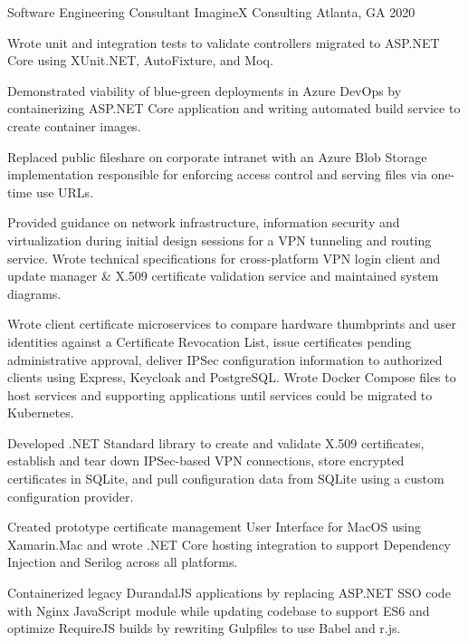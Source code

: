 

\begin{cventries}

  \cventry
    {Software Engineering Consultant} %
    {ImagineX Consulting} %
    {Atlanta, GA} %
    {2020} %
    {
      \begin{cvitems} %
        \item {Wrote unit and integration tests to validate controllers migrated to ASP.NET Core using XUnit.NET, AutoFixture, and Moq.}
        \item {Demonstrated viability of blue-green deployments in Azure DevOps by containerizing ASP.NET Core application and writing automated build service to create container images.}
        \item {Replaced public fileshare on corporate intranet with an Azure Blob Storage implementation responsible for enforcing access control and serving files via one-time use URLs.}
        \item {Provided guidance on network infrastructure, information security and virtualization during initial design sessions for a VPN tunneling and routing service. Wrote technical specifications for cross-platform VPN login client and update manager \& X.509 certificate validation service and maintained system diagrams.}
        \item {Wrote client certificate microservices to compare hardware thumbprints and user identities against a Certificate Revocation List, issue certificates pending administrative approval, deliver IPSec configuration information to authorized clients using Express, Keycloak and PostgreSQL. Wrote Docker Compose files to host services and supporting applications until services could be migrated to Kubernetes.}
        \item {Developed .NET Standard library to create and validate X.509 certificates, establish and tear down IPSec-based VPN connections, store encrypted certificates in SQLite, and pull configuration data from SQLite using a custom configuration provider.}
        \item {Created prototype certificate management User Interface for MacOS using Xamarin.Mac and wrote .NET Core hosting integration to support Dependency Injection and Serilog across all platforms.}
        \item {Containerized legacy DurandalJS applications by replacing ASP.NET SSO code with Nginx JavaScript module while updating codebase to support ES6 and optimize RequireJS builds by rewriting Gulpfiles to use Babel and r.js.}
      \end{cvitems}
    }


\end{cventries}
